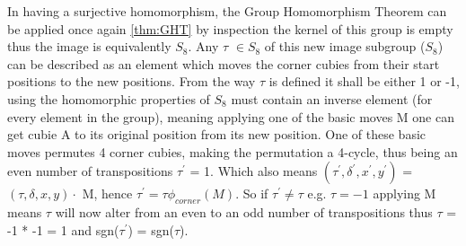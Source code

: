 \documentclass{article}
\newcounter{prop}[section]\setcounter{prop}{0}
\newcounter{lem}[section]\setcounter{lem}{0}
\begin{document}
 In having a surjective homomorphism, the Group Homomorphism Theorem can be applied once again \ref{thm:GHT} by inspection the kernel of this group is empty thus the image is equivalently $S_{8}$. Any $\tau$ $\in S_{8}$ of this new image subgroup ($S_8$) can be described as an element which moves the corner cubies from their start positions to the new positions. From the way $\tau$ is defined it shall be either 1 or -1, using the homomorphic properties of $S_{8}$ must contain an inverse element (for every element in the group), meaning applying one of the basic moves M one can get cubie A to its original position from its new position. One of these basic moves permutes 4 corner cubies, making the permutation a 4-cycle, thus being an even number of transpositions $\tau^{'}$ = 1. Which also means $(\tau^{'} ,\delta^{'} , x^{'} , y^{'} )$ = $(\tau,\delta, x, y) \cdot$ M, hence $\tau^{'} = \tau\phi_{corner}(M)$. So if $\tau^{'} \neq \tau$ e.g. $\tau = -1$ applying M means $\tau$ will now alter from an even to an odd number of transpositions thus $\tau$ = -1 * -1 = 1 and sgn($\tau^{'}$) = sgn($\tau$).

\paragraph*{}
\end{document}
